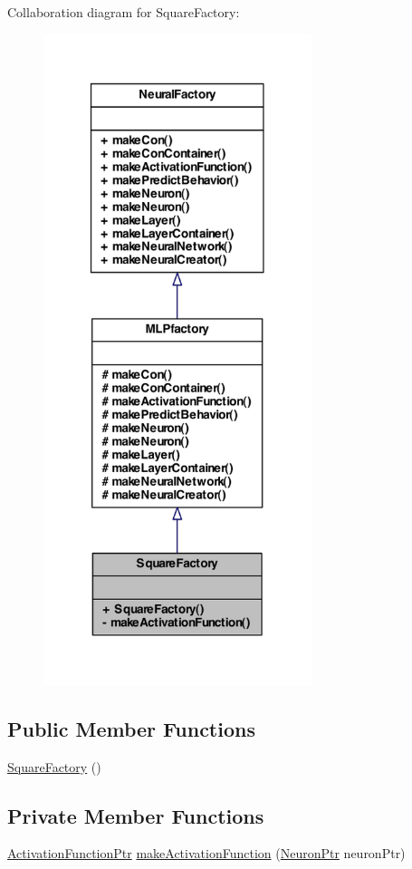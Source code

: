 Collaboration diagram for SquareFactory:
\nopagebreak
\begin{figure}[H]
\begin{center}
\leavevmode
\includegraphics[width=222pt]{class_square_factory__coll__graph}
\end{center}
\end{figure}
\subsection*{Public Member Functions}
\begin{DoxyCompactItemize}
\item 
\hyperlink{class_square_factory_a4b4383a3bbd89da3a986067cb0636449}{SquareFactory} ()
\end{DoxyCompactItemize}
\subsection*{Private Member Functions}
\begin{DoxyCompactItemize}
\item 
\hyperlink{_a_m_o_r_e_8h_a77602a0277a02e5769c3df0adc669b17}{ActivationFunctionPtr} \hyperlink{class_square_factory_a1fe378c014b3713865f88c49e96ba938}{makeActivationFunction} (\hyperlink{_a_m_o_r_e_8h_ac1ea936c2c7728eb382278131652fef4}{NeuronPtr} neuronPtr)
\end{DoxyCompactItemize}


